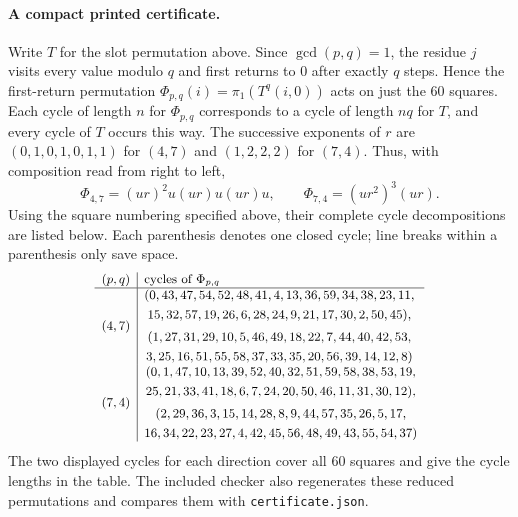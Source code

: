 \documentclass[11pt]{article}
\theoremstyle{remark}
\begin{document}
\paragraph{A compact printed certificate.}
Write $T$ for the slot permutation above. Since $\gcd(p,q)=1$, the residue
$j$ visits every value modulo $q$ and first returns to $0$ after exactly
$q$ steps. Hence the first-return permutation
$\Phi_{p,q}(i)=\pi_1(T^q(i,0))$ acts on just the 60 squares.
Each cycle of length $n$ for $\Phi_{p,q}$ corresponds to a cycle of length
$nq$ for $T$, and every cycle of $T$ occurs this way.
The successive exponents of $r$ are $(0,1,0,1,0,1,1)$ for $(4,7)$ and
$(1,2,2,2)$ for $(7,4)$. Thus, with composition read from right to left,
\[
\Phi_{4,7}=(ur)^2u(ur)u(ur)u,
\qquad
\Phi_{7,4}=(ur^2)^3(ur).
\]
Using the square numbering specified above, their complete cycle
decompositions are listed below. Each parenthesis denotes one closed cycle;
line breaks within a parenthesis only save space.
\[
\small
\begin{array}{c|l}
(p,q)&\text{cycles of }\Phi_{p,q}\\ \hline
(4,7)&\begin{gathered}
(0,43,47,54,52,48,41,4,13,36,59,34,38,23,11,\\
15,32,57,19,26,6,28,24,9,21,17,30,2,50,45),\\[2pt]
(1,27,31,29,10,5,46,49,18,22,7,44,40,42,53,\\
3,25,16,51,55,58,37,33,35,20,56,39,14,12,8)
\end{gathered}\\[7pt]
(7,4)&\begin{gathered}
(0,1,47,10,13,39,52,40,32,51,59,58,38,53,19,\\
25,21,33,41,18,6,7,24,20,50,46,11,31,30,12),\\[2pt]
(2,29,36,3,15,14,28,8,9,44,57,35,26,5,17,\\
16,34,22,23,27,4,42,45,56,48,49,43,55,54,37)
\end{gathered}
\end{array}
\]
The two displayed cycles for each direction cover all 60 squares and give the
cycle lengths in the table. The included checker also regenerates these
reduced permutations and compares them with \texttt{certificate.json}.
\end{document}
